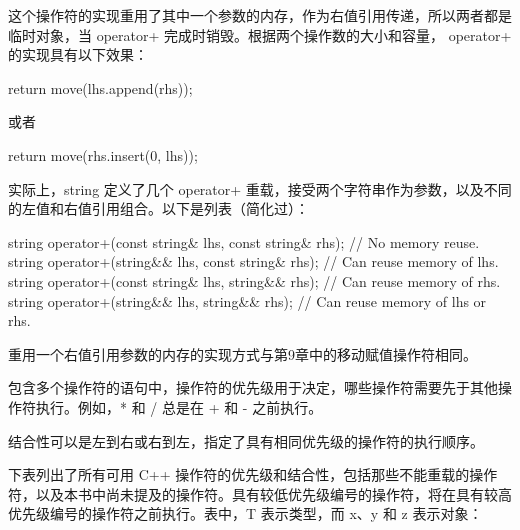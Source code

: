 这个操作符的实现重用了其中一个参数的内存，作为右值引用传递，所以两者都是临时对象，当 operator+ 完成时销毁。根据两个操作数的大小和容量， operator+ 的实现具有以下效果：

\begin{cpp}
return move(lhs.append(rhs));
\end{cpp}

或者

\begin{cpp}
return move(rhs.insert(0, lhs));
\end{cpp}

实际上，string 定义了几个 operator+ 重载，接受两个字符串作为参数，以及不同的左值和右值引用组合。以下是列表（简化过）：

\begin{cpp}
string operator+(const string& lhs, const string& rhs); // No memory reuse.
string operator+(string&& lhs, const string& rhs); // Can reuse memory of lhs.
string operator+(const string& lhs, string&& rhs); // Can reuse memory of rhs.
string operator+(string&& lhs, string&& rhs); // Can reuse memory of lhs or rhs.
\end{cpp}

重用一个右值引用参数的内存的实现方式与第9章中的移动赋值操作符相同。


包含多个操作符的语句中，操作符的优先级用于决定，哪些操作符需要先于其他操作符执行。例如，* 和 / 总是在 + 和 - 之前执行。

结合性可以是左到右或右到左，指定了具有相同优先级的操作符的执行顺序。

下表列出了所有可用 C++ 操作符的优先级和结合性，包括那些不能重载的操作符，以及本书中尚未提及的操作符。具有较低优先级编号的操作符，将在具有较高优先级编号的操作符之前执行。表中，T 表示类型，而 x、y 和 z 表示对象：

